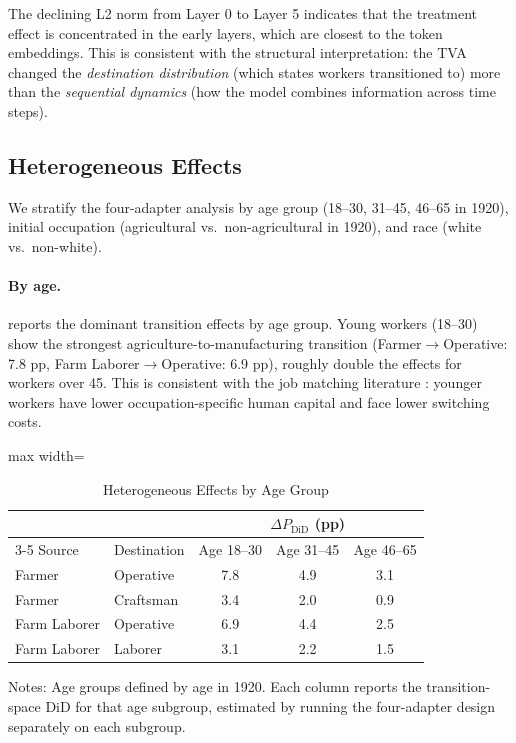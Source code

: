 \documentclass[12pt]{article}
\begin{document}
The declining L2 norm from Layer 0 to Layer 5 indicates that the treatment effect is concentrated in the early layers, which are closest to the token embeddings. This is consistent with the structural interpretation: the TVA changed the \textit{destination distribution} (which states workers transitioned to) more than the \textit{sequential dynamics} (how the model combines information across time steps).

\subsection{Heterogeneous Effects}

We stratify the four-adapter analysis by age group (18--30, 31--45, 46--65 in 1920), initial occupation (agricultural vs.\ non-agricultural in 1920), and race (white vs.\ non-white).

\paragraph{By age.}  reports the dominant transition effects by age group. Young workers (18--30) show the strongest agriculture-to-manufacturing transition (Farmer$\to$Operative: 7.8 pp, Farm Laborer$\to$Operative: 6.9 pp), roughly double the effects for workers over 45. This is consistent with the job matching literature \citep{jovanovic1979job}: younger workers have lower occupation-specific human capital and face lower switching costs.

\begin{table}[H]
\centering
\caption{Heterogeneous Effects by Age Group}
\label{tab:hetero_age}
\begin{threeparttable}
\begin{adjustbox}{max width=\textwidth}
\begin{tabular}{llccc}
\toprule
& & \multicolumn{3}{c}{$\Delta P_{\text{DiD}}$ (pp)} \\
\cmidrule(lr){3-5}
Source & Destination & Age 18--30 & Age 31--45 & Age 46--65 \\
\midrule
Farmer & Operative & 7.8 & 4.9 & 3.1 \\
Farmer & Craftsman & 3.4 & 2.0 & 0.9 \\
Farm Laborer & Operative & 6.9 & 4.4 & 2.5 \\
Farm Laborer & Laborer & 3.1 & 2.2 & 1.5 \\
\bottomrule
\end{tabular}
\end{adjustbox}
\begin{tablenotes}[flushleft]
\small
\item Notes: Age groups defined by age in 1920. Each column reports the transition-space DiD for that age subgroup, estimated by running the four-adapter design separately on each subgroup.
\end{tablenotes}
\end{threeparttable}
\end{table}
\end{document}
